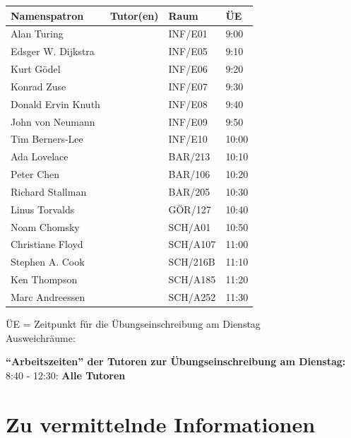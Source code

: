 \documentclass[a4paper,12pt]{report}
\begin{document}
\vspace{1cm}
\begin{tabular}[h]{|l|l|l|l|}
	\hline
	\textbf{Namenspatron} & \textbf{Tutor(en)} & \textbf{Raum} & \textbf{ÜE} \\ \hline
	Alan Turing &				& INF/E01 &  9:00\\
	Edsger W. Dijkstra & 	   	& INF/E05 &  9:10\\
	Kurt Gödel & 				& INF/E06 & 9:20\\
	Konrad Zuse & 			& INF/E07 &  9:30\\
	Donald Ervin Knuth & 		& INF/E08 & 9:40\\
	John von Neumann & 		& INF/E09 &  9:50\\
	Tim Berners-Lee & 			& INF/E10 &  10:00\\
	Ada Lovelace & 			& BAR/213 &  10:10\\
	Peter Chen & 			& BAR/106 &  10:20\\
	Richard Stallman &			& BAR/205 & 10:30\\
	Linus Torvalds & 			& GÖR/127 &  10:40\\
	Noam Chomsky & 			& SCH/A01 &  10:50\\
	Christiane Floyd & 			& SCH/A107 &  11:00\\
	Stephen A. Cook & 			& SCH/216B &  11:10\\
	Ken Thompson & 			& SCH/A185 &  11:20\\
	Marc Andreessen & 		& SCH/A252 &  11:30\\
	\hline
\end{tabular}
\begin{center}
	ÜE = Zeitpunkt für die Übungseinschreibung am Dienstag\\
Ausweichräume: 
\end{center}
\vspace{0.5cm}
\textbf{``Arbeitszeiten'' der Tutoren zur Übungseinschreibung am Dienstag:}
\vspace{0.2cm}\\
8:40 - 12:30: \textbf{Alle Tutoren}


\chapter{Zu vermittelnde Informationen}
\end{document}
